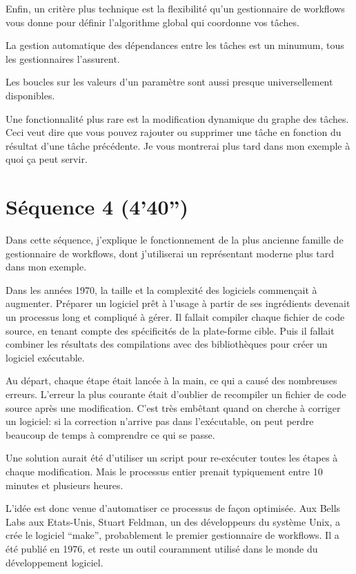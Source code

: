 \documentclass[12pt]{article}
\begin{document}
\newpage

Enfin, un critère plus technique est la flexibilité qu'un gestionnaire
de workflows vous donne pour définir l'algorithme global qui coordonne
vos tâches.

La gestion automatique des dépendances entre les tâches est un
minumum, tous les gestionnaires l'assurent.

Les boucles sur les valeurs d'un paramètre sont aussi presque
universellement disponibles.

Une fonctionnalité plus rare est la modification dynamique du graphe
des tâches. Ceci veut dire que vous pouvez rajouter ou supprimer une
tâche en fonction du résultat d'une tâche précédente. Je vous
montrerai plus tard dans mon exemple à quoi ça peut servir.

\newpage
\section*{Séquence 4 (4'40'')}

Dans cette séquence, j'explique le fonctionnement de la plus ancienne
famille de gestionnaire de workflows, dont j'utiliserai un
représentant moderne plus tard dans mon exemple.

\newpage

Dans les années 1970, la taille et la complexité des logiciels
commençait à augmenter. Préparer un logiciel prêt à l'usage à partir
de ses ingrédients devenait un processus long et compliqué à gérer.
Il fallait compiler chaque fichier de code source, en tenant
compte des spécificités de la plate-forme cible. Puis il fallait
combiner les résultats des compilations avec des bibliothèques
pour créer un logiciel exécutable.

Au départ, chaque étape était lancée à la main, ce qui a causé des
nombreuses erreurs. L'erreur la plus courante était d'oublier de
recompiler un fichier de code source après une modification. C'est
très embêtant quand on cherche à corriger un logiciel: si la
correction n'arrive pas dans l'exécutable, on peut perdre beaucoup de
temps à comprendre ce qui se passe.

Une solution aurait été d'utiliser un script pour re-exécuter toutes
les étapes à chaque modification. Mais le processus entier prenait
typiquement entre 10 minutes et plusieurs heures.

L'idée est donc venue d'automatiser ce processus de façon
optimisée. Aux Bells Labs aux Etats-Unis, Stuart Feldman, un des
développeurs du système Unix, a crée le logiciel ``make'',
probablement le premier gestionnaire de workflows. Il a été publié en
1976, et reste un outil couramment utilisé dans le monde du
développement logiciel.
\end{document}
